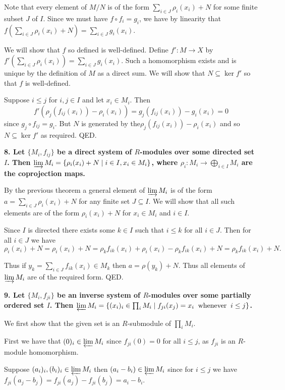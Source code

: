 \documentclass[12pt]{article}
\begin{document}
Note that every element of $M/N$ is of the form $\sum_{i \in J} \rho_i(x_i) + N$ for some finite subset $J$ of $I$. Since we must have $f\circ f_i = g_i$, we have by linearity that $f\left(\sum_{i \in J} \rho_i(x_i) + N\right) = \sum_{i\in J} g_i(x_i)$.

We will show that $f$ so defined is well-defined. Define $f' : M \to X$ by $f'\left(\sum_{i\in J} \rho_i(x_i)\right) = \sum_{i\in J} g_i(x_i)$. Such a homomorphism exists and is unique by the definition of $M$ as a direct sum. We will show that $N \subseteq \ker f'$ so that $f$ is well-defined.

Suppose $i \leq j$ for $i, j \in I$ and let $x_i \in M_i$. Then
$$f'(\rho_j(f_{ij}(x_i)) - \rho_i(x_i)) = g_j(f_{ij}(x_i)) - g_i(x_i) = 0$$
since $g_j\circ f_{ij} = g_i$. But $N$ is generated by the$\rho_j(f_{ij}(x_i)) - \rho_i(x_i)$ and so $N \subseteq \ker f'$ as required. QED.

\textbf{8. Let $\{M_i, f_{ij}\}$ be a direct system of $R$-modules over some directed set $I$. Then $\varinjlim M_i = \{\rho_i(x_i) + N \;|\; i \in I, x_i \in M_i\}$, where $\rho_i : M_i \to \bigoplus_{i\in I} M_i$ are the coprojection maps.}

By the previous theorem a general element of $\varinjlim M_i$ is of the form $a = \sum_{i\in J} \rho_i(x_i) + N$ for any finite set $J \subseteq I$. We will show that all such elements are of the form $\rho_i(x_i) + N$ for $x_i \in M_i$ and $i \in I$.

Since $I$ is directed there exists some $k \in I$ such that $i \leq k$ for all $i \in J$. Then for all $i \in J$ we have 
$$\rho_i(x_i) + N = \rho_i(x_i) + N = \rho_k f_{ik}(x_i) + \rho_i(x_i) - \rho_k f_{ik}(x_i) + N = \rho_k f_{ik}(x_i) + N.$$

Thus if $y_k = \sum_{i \in J} f_{ik}(x_i) \in M_k$ then $a = \rho(y_k) + N$. Thus all elements of $\varinjlim M_i$ are of the required form. QED.

\textbf{9. Let $\{M_i, f_{ji}\}$ be an inverse system of $R$-modules over some partially ordered set $I$. Then $\varprojlim M_i = \{(x_i)_i \in \prod_i M_i \;|\; f_{ji}(x_j) = x_i \;\;\mbox{whenever}\;\; i \leq j\}$.}

We first show that the given set is an $R$-submodule of $\prod_i M_i$.

First we have that $(0)_i \in \varprojlim M_i$ since $f_{ji}(0) = 0$ for all $i \leq j$, as $f_{ji}$ is an $R$-module homomorphism. 

Suppose $(a_i)_i, (b_i)_i \in \varprojlim M_i$ then $(a_i - b_i) \in \varprojlim M_i$ since for $i \leq j$ we have $f_{ji}(a_j - b_j) = f_{ji}(a_j) - f_{ji}(b_j) = a_i - b_i$.
\end{document}
